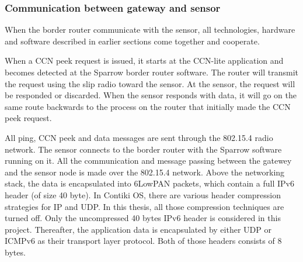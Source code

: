 \subsubsection{Communication between gateway and sensor}

When the border router communicate with the sensor, all technologies, hardware and software described in earlier sections come together and cooperate.

When a CCN peek request is issued, it starts at the CCN-lite application and becomes detected at the Sparrow border router software. The router will transmit the request using the slip radio toward the sensor. At the sensor, the request will be responded or discarded. When the sensor responds with data, it will go on the same route backwards to the process on the router that initially made the CCN peek request.

All ping, CCN peek and data messages are sent through the 802.15.4 radio network. The sensor connects to the border router with the Sparrow software running on it. All the communication and message passing between the gatewey and the sensor node is made over the 802.15.4 network. Above the networking stack, the data is encapsulated into 6LowPAN packets, which contain a full IPv6 header (of size 40 byte). In Contiki OS, there are various header compression strategies for IP and UDP. In this thesis, all those compression techniques are turned off. Only the uncompressed 40 bytes IPv6 header is considered in this project. Thereafter, the application data is encapsulated by either UDP or ICMPv6 as their transport layer protocol. Both of those headers consists of 8 bytes. 


 



